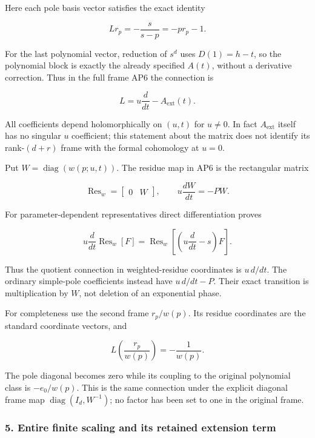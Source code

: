 \documentclass{article}
\begin{document}
Here each pole basis vector satisfies the exact identity

\[
L r_p=-\frac{s}{s-p}=-p r_p-1.
\tag{AP9}
\]

For the last polynomial vector, reduction of \(s^d\) uses \(D(1)=h-t\), so the polynomial block is exactly the already specified \(A(t)\), without a derivative correction. Thus in the full frame AP6 the connection is

\[
L=u\frac{d}{dt}-A_{\mathrm{ext}}(t).
\tag{AP10}
\]

All coefficients depend holomorphically on \((u,t)\) for \(u\ne0\). In fact \(A_{\mathrm{ext}}\) itself has no singular \(u\) coefficient; this statement about the matrix does not identify its rank-\((d+r)\) frame with the formal cohomology at \(u=0\).

Put \(W=\operatorname{diag}(w(p;u,t))\). The residue map in AP6 is the rectangular matrix

\[
\operatorname{Res}_w=\begin{bmatrix}0&W\end{bmatrix},\qquad
u\frac{dW}{dt}=-P W.
\tag{AP11}
\]

For parameter-dependent representatives direct differentiation proves

\[
u\frac{d}{dt}\operatorname{Res}_w[F]
=\operatorname{Res}_w\left[\left(u\frac{d}{dt}-s\right)F\right].
\tag{AP12}
\]

Thus the quotient connection in weighted-residue coordinates is \(u\,d/dt\). The ordinary simple-pole coefficients instead have \(u\,d/dt-P\). Their exact transition is multiplication by \(W\), not deletion of an exponential phase.

For completeness use the second frame \(r_p/w(p)\). Its residue coordinates are the standard coordinate vectors, and

\[
L\left(\frac{r_p}{w(p)}\right)=-\frac{1}{w(p)}.
\tag{AP13}
\]

The pole diagonal becomes zero while its coupling to the original polynomial class is \(-e_0/w(p)\). This is the same connection under the explicit diagonal frame map \(\operatorname{diag}(I_d,W^{-1})\); no factor has been set to one in the original frame.

\subsubsection{5. Entire finite scaling and its retained extension term}\label{endpoint-analytic_pole--entire-finite-scaling-and-its-retained-extension-term}
\end{document}
